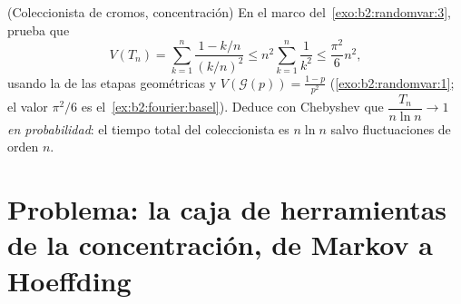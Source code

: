 \begin{exercise}[$\star\star\star$]\label{exo:b2:randomvar:12}
(Coleccionista de cromos, concentración) En el marco del~\cref{exo:b2:randomvar:3}, prueba que
\[
V(T_n) = \sum_{k=1}^n\frac{1 - k/n}{(k/n)^2}
\leq n^2\sum_{k=1}^n\frac{1}{k^2} \leq \frac{\pi^2}{6}n^2,
\]
usando la  de las etapas geométricas y $V(\mathcal G(p))
= \frac{1-p}{p^2}$ (\cref{exo:b2:randomvar:1}; el valor $\pi^2/6$ es
el~\cref{ex:b2:fourier:basel}). Deduce con Chebyshev que
$\dfrac{T_n}{n\ln n} \to 1$ \emph{en probabilidad}: el tiempo total
del coleccionista es $n\ln n$ salvo fluctuaciones de orden $n$.
\end{exercise}

\section{Problema: la caja de herramientas de la concentración, de
Markov a Hoeffding}

